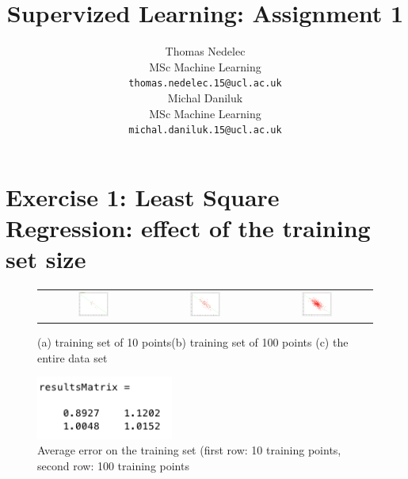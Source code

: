 \documentclass{article} %
\author{
Thomas Nedelec \\
MSc Machine Learning\\
\texttt{thomas.nedelec.15@ucl.ac.uk} \\
\And
Michal Daniluk \\
MSc Machine Learning\\
\texttt{michal.daniluk.15@ucl.ac.uk} \\
}
\title{Supervized Learning: Assignment 1}
\begin{document}
\maketitle

\begin{abstract}

\end{abstract}

\section{Exercise 1: Least Square Regression: effect of the training set size}

  \begin{figure}[H]
\center
\begin{tabular}{ccc}
\includegraphics[width=0.3\textwidth]{10points}&\includegraphics[width=0.3\textwidth]{100points}&\includegraphics[width=0.3\textwidth]{500points}
\end{tabular}
\caption{ (a) training set of 10 points(b) training set of 100 points (c) the entire data set}
\end{figure}


\begin{figure}[H]
\begin{center}
\includegraphics[width=0.4\textwidth]{resultsMatrix}
\end{center}
\caption{Average error on the training set (first row: 10 training points, second row: 100 training points}
\end{figure}
\end{document}
